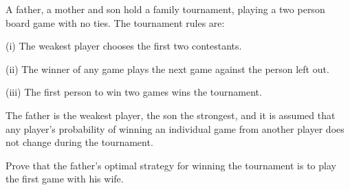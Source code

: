 A father, a mother and son hold a family tournament, playing a two person board game with no ties. The tournament rules are:

(i) The weakest player chooses the first two contestants.

(ii) The winner of any game plays the next game against the person left out.

(iii) The first person to win two games wins the tournament.

The father is the weakest player, the son the strongest, and it is assumed that any player's probability of winning an individual game from another player does not change during the tournament.

Prove that the father's optimal strategy for winning the tournament is to play the first game with his wife.